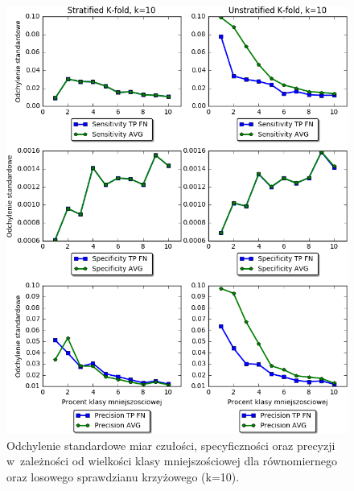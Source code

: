 \begin{figure}[H]
	\centering
	\includegraphics[width=\textwidth]{./images/stdwsk.png}
	\caption[Odchylenie standardowe miar dla sprawdzianu krzyżowego]{Odchylenie standardowe miar czułości, specyficzności oraz precyzji w~zależności od wielkości klasy mniejszościowej dla równomiernego oraz losowego sprawdzianu krzyżowego (k=10).}
	\label{fig:wskaznikistd}
\end{figure}
\newpage
